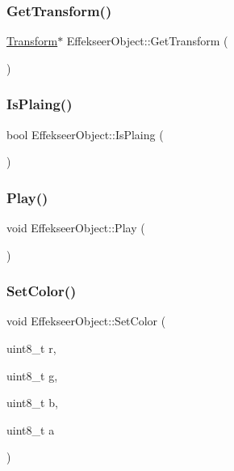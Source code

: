 \subsubsection{\texorpdfstring{Get\+Transform()}{GetTransform()}}
{\footnotesize\ttfamily \mbox{\hyperlink{class_transform}{Transform}}$\ast$ Effekseer\+Object\+::\+Get\+Transform (\begin{DoxyParamCaption}{ }\end{DoxyParamCaption})\hspace{0.3cm}{\ttfamily [inline]}}

\mbox{\label{class_effekseer_object_a6fe253dd3387bdfd9305878ff194f305}} 
\subsubsection{\texorpdfstring{Is\+Plaing()}{IsPlaing()}}
{\footnotesize\ttfamily bool Effekseer\+Object\+::\+Is\+Plaing (\begin{DoxyParamCaption}{ }\end{DoxyParamCaption})\hspace{0.3cm}{\ttfamily [inline]}}

\mbox{\label{class_effekseer_object_a59c8a12b4eb558449622660d892b3cf4}} 
\subsubsection{\texorpdfstring{Play()}{Play()}}
{\footnotesize\ttfamily void Effekseer\+Object\+::\+Play (\begin{DoxyParamCaption}{ }\end{DoxyParamCaption})}

\mbox{\label{class_effekseer_object_a5c496e56785ef7b784b13642d59d4e7f}} 
\subsubsection{\texorpdfstring{Set\+Color()}{SetColor()}}
{\footnotesize\ttfamily void Effekseer\+Object\+::\+Set\+Color (\begin{DoxyParamCaption}\item[{uint8\+\_\+t}]{r,  }\item[{uint8\+\_\+t}]{g,  }\item[{uint8\+\_\+t}]{b,  }\item[{uint8\+\_\+t}]{a }\end{DoxyParamCaption})}

